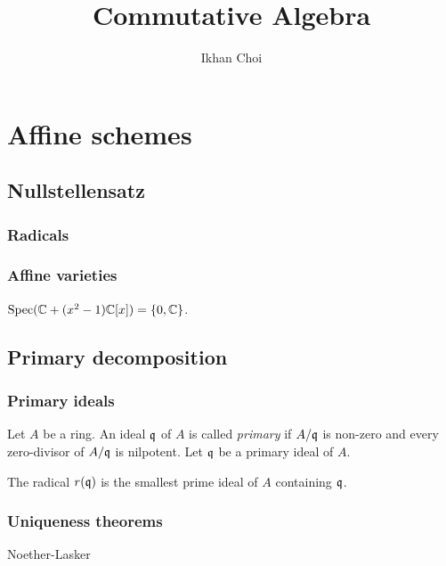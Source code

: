\documentclass{../../large}
\begin{document}
\title{Commutative Algebra}
\author{Ikhan Choi}
\maketitle
\tableofcontents

\part{Affine schemes}
\chapter{Nullstellensatz}

\section{Radicals}

\section{Affine varieties}
\begin{prb}
\end{prb}
\begin{prb}
\end{prb}


$\operatorname{Spec}(\mathbb{C}+(x^2-1)\mathbb{C}[x])=\{0,\mathbb{C}\}$.




\chapter{Primary decomposition}

\section{Primary ideals}
\begin{prb}
Let $A$ be a ring.
An ideal $\mathfrak{q}$ of $A$ is called \emph{primary} if $A/\mathfrak{q}$ is non-zero and every zero-divisor of $A/\mathfrak{q}$ is nilpotent.
Let $\mathfrak{q}$ be a primary ideal of $A$.
\begin{parts}
\item The radical $r(\mathfrak{q})$ is the smallest prime ideal of $A$ containing $\mathfrak{q}$.
\end{parts}
\end{prb}

\section{Uniqueness theorems}
Noether-Lasker
\end{document}
